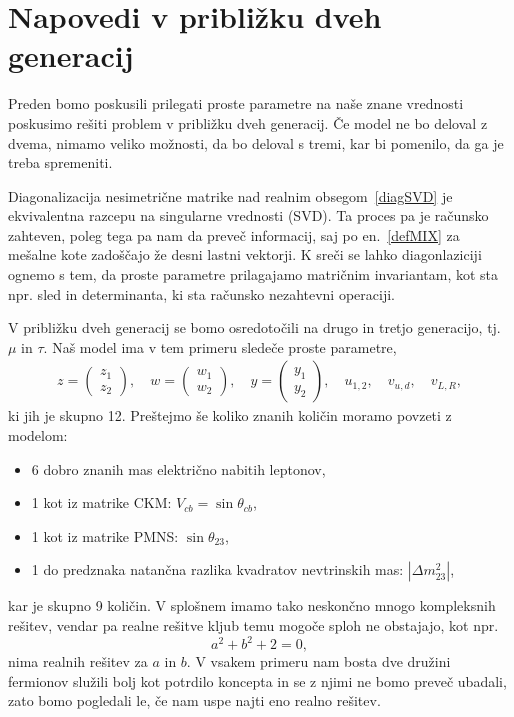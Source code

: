 \chapter{Napovedi v približku dveh generacij}

Preden bomo poskusili prilegati proste parametre na naše znane vrednosti poskusimo rešiti problem
v približku dveh generacij. Če model ne bo deloval z dvema, nimamo veliko možnosti, da bo deloval
s tremi, kar bi pomenilo, da ga je treba spremeniti.

Diagonalizacija nesimetrične matrike nad realnim obsegom~\eqref{diagSVD} je ekvivalentna razcepu
na singularne vrednosti (SVD). Ta proces pa je računsko zahteven, poleg tega pa nam da preveč
informacij, saj po en.~\eqref{defMIX} za mešalne kote zadoščajo že desni lastni vektorji. K sreči
se lahko diagonlaziciji ognemo s tem, da proste parametre prilagajamo matričnim invariantam, kot
sta npr. sled in determinanta, ki sta računsko nezahtevni operaciji.

V približku dveh generacij se bomo osredotočili na drugo in tretjo generacijo, tj. $\mu$ in $\tau$.
Naš model ima v tem primeru sledeče proste parametre,
\begin{align}
	z = \begin{pmatrix}
		z_1 \\ z_2
	\end{pmatrix}, \quad w = \begin{pmatrix}
		w_1 \\ w_2
	\end{pmatrix}, \quad y = \begin{pmatrix}
		y_1 \\ y_2
	\end{pmatrix}, \quad u_{1,2}, \quad v_{u,d},
	\quad v_{L,R},
\end{align}
ki jih je skupno 12. Preštejmo še koliko znanih količin moramo povzeti z modelom:
\begin{itemize}
	\item{6 dobro znanih mas električno nabitih leptonov,}
	\item{1 kot iz matrike CKM: $V_{cb} = \sin\theta_{cb}$,}
	\item{1 kot iz matrike PMNS: $\sin\theta_{23}$,}
	\item{1 do predznaka natančna razlika kvadratov nevtrinskih mas: $|\Delta m_{23}^2|$,}
\end{itemize}
kar je skupno 9 količin. V splošnem imamo tako neskončno mnogo kompleksnih rešitev, vendar pa
realne rešitve kljub temu mogoče sploh ne obstajajo, kot npr.
\[
	a^2 + b^2 + 2 = 0,
\]
nima realnih rešitev za $a$ in $b$. V vsakem primeru nam bosta dve družini fermionov služili bolj
kot potrdilo koncepta in se z njimi ne bomo preveč ubadali, zato bomo pogledali le, če nam uspe
najti eno realno rešitev.

